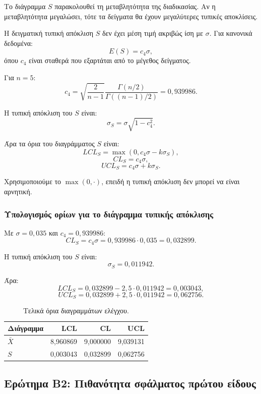 \documentclass[12pt,a4paper]{article}
\begin{document}
Το διάγραμμα \(S\) παρακολουθεί τη μεταβλητότητα της διαδικασίας. Αν η
μεταβλητότητα μεγαλώσει, τότε τα δείγματα θα έχουν μεγαλύτερες τυπικές
αποκλίσεις.

Η δειγματική τυπική απόκλιση \(S\) δεν έχει μέση τιμή ακριβώς ίση με
\(\sigma\). Για κανονικά δεδομένα:
\[
    E(S)=c_4\sigma,
\]
όπου \(c_4\) είναι σταθερά που εξαρτάται από το μέγεθος δείγματος.

Για \(n=5\):
\[
    c_4=
    \sqrt{\frac{2}{n-1}}
    \frac{\Gamma(n/2)}{\Gamma((n-1)/2)}
    =0{,}939986.
\]

Η τυπική απόκλιση του \(S\) είναι:
\[
    \sigma_S=\sigma\sqrt{1-c_4^2}.
\]

Άρα τα όρια του διαγράμματος \(S\) είναι:
\[
    LCL_S=\max(0,c_4\sigma-k\sigma_S),
\]
\[
    CL_S=c_4\sigma,
\]
\[
    UCL_S=c_4\sigma+k\sigma_S.
\]

Χρησιμοποιούμε το \(\max(0,\cdot)\), επειδή η τυπική απόκλιση δεν μπορεί να
είναι αρνητική.

\subsubsection*{Υπολογισμός ορίων για το διάγραμμα τυπικής απόκλισης}

Με \(\sigma=0{,}035\) και \(c_4=0{,}939986\):
\[
    CL_S=c_4\sigma=0{,}939986\cdot 0{,}035=0{,}032899.
\]

Η τυπική απόκλιση του \(S\) είναι:
\[
    \sigma_S=0{,}011942.
\]

Άρα:
\[
    LCL_S=0{,}032899-2{,}5\cdot 0{,}011942=0{,}003043,
\]
\[
    UCL_S=0{,}032899+2{,}5\cdot 0{,}011942=0{,}062756.
\]

\begin{table}[H]
\centering
\caption{Τελικά όρια διαγραμμάτων ελέγχου.}
\begin{tabular}{lrrr}
\toprule
\textbf{Διάγραμμα} & \textbf{LCL} & \textbf{CL} & \textbf{UCL} \\
\midrule
\(\bar X\) & 8,960869 & 9,000000 & 9,039131 \\
\(S\) & 0,003043 & 0,032899 & 0,062756 \\
\bottomrule
\end{tabular}
\end{table}

\subsection{Ερώτημα Β2: Πιθανότητα σφάλματος πρώτου είδους}
\end{document}
